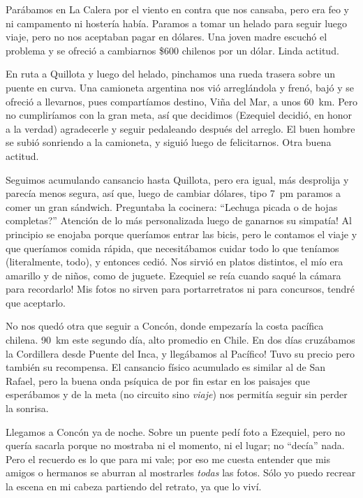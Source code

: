 Par\'abamos en La Calera por el viento en contra que nos cansaba, pero era feo y
ni campamento ni hoster\'ia hab\'ia. Paramos a tomar un helado para seguir luego
viaje, pero no nos aceptaban pagar en d\'olares. Una joven madre escuch\'o el
problema y se ofreci\'o a cambiarnos \$600 chilenos por un d\'olar. Linda
actitud.

En ruta a Quillota y luego del helado, pinchamos una rueda trasera sobre un
puente en curva. Una camioneta argentina nos vi\'o arregl\'andola y fren\'o,
baj\'o y se ofreci\'o a llevarnos, pues compart\'iamos destino, Vi\~na del Mar,
a unos 60~km. Pero no cumplir\'iamos con la gran meta, as\'i que decidimos
(Ezequiel decidi\'o, en honor a la verdad) agradecerle y seguir pedaleando
despu\'es del arreglo. El buen hombre se subi\'o sonriendo a la camioneta, y
sigui\'o luego de felicitarnos. Otra buena actitud.

Seguimos acumulando cansancio hasta Quillota, pero era igual, m\'as desprolija y
parec\'ia menos segura, as\'i que, luego de cambiar d\'olares, tipo 7~pm paramos
a comer un gran s\'andwich. Preguntaba la cocinera: ``\textquestiondown Lechuga
picada o de hojas completas?'' \textexclamdown Atenci\'on de lo m\'as
personalizada luego de ganarnos su simpat\'ia! Al principio se enojaba porque
quer\'iamos entrar las bicis, pero le contamos el viaje y que quer\'iamos comida
r\'apida, que necesit\'abamos cuidar todo lo que ten\'iamos (literalmente,
todo), y entonces cedi\'o. Nos sirvi\'o en platos distintos, el m\'io era
amarillo y de ni\~nos, como de juguete. \textexclamdown Ezequiel se
re\'ia cuando saqu\'e la c\'amara para recordarlo! Mis fotos no sirven para
portarretratos ni para concursos, tendr\'e que aceptarlo.

No nos qued\'o otra que seguir a Conc\'on, donde empezar\'ia la costa pac\'ifica
chilena. 90~km este segundo d\'ia, alto promedio en Chile. \textexclamdown En
dos d\'ias cruz\'abamos la Cordillera desde Puente del Inca, y lleg\'abamos al
Pac\'ifico! Tuvo su precio pero tambi\'en su recompensa. El cansancio f\'isico
acumulado es similar al de San Rafael, pero la buena onda ps\'iquica de por fin
estar en los paisajes que esper\'abamos y de la meta (no circuito sino
\emph{viaje}) nos permit\'ia seguir sin perder la sonrisa.

Llegamos a Conc\'on ya de noche. Sobre un puente ped\'i foto a Ezequiel, pero no
quer\'ia sacarla porque no mostraba ni el momento, ni el lugar; no ``dec\'ia''
nada. Pero el recuerdo es lo que para mi vale; por eso me cuesta entender que
mis amigos o hermanos se aburran al mostrarles \emph{todas} las fotos. S\'olo yo
puedo recrear la escena en mi cabeza partiendo del retrato, ya que lo viv\'i.

